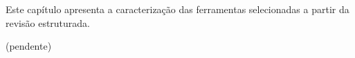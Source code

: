 {Este capítulo apresenta a caracterização das ferramentas selecionadas a partir
da revisão estruturada.}
\label{caracterizacao-ferramentas}

(pendente)

%
%
%
%
%
%
